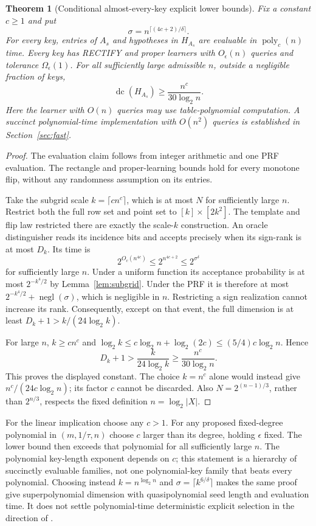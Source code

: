 \documentclass[11pt]{article}
\newtheorem{theorem}{Theorem}
\DeclareMathOperator{\dc}{dc}
\newcommand{\1}{\mathbf 1}
\begin{document}
\begin{samepage}
\begin{theorem}[Conditional almost-every-key explicit lower bounds]\label{thm:prf}
Fix a constant $c\ge1$ and put
\[
 \sigma=n^{\lceil(4c+2)/\delta\rceil}.
\]
For every key, entries of $A_s$ and hypotheses in $H_{A_s}$ are evaluable in $\operatorname{poly}_c(n)$ time. Every key has RECTIFY and proper learners with $O_\epsilon(n)$ queries and tolerance $\Omega_\epsilon(1)$. For all sufficiently large admissible $n$, outside a negligible fraction of keys,
\[
 \boxed{\dc(H_{A_s})\ge\frac{n^c}{30\log_2n}.}
\]
Here the learner with $O(n)$ queries may use table-polynomial computation. A succinct polynomial-time implementation with $O(n^2)$ queries is established in Section~\ref{sec:fast}.
\end{theorem}
\end{samepage}
\begin{proof}
The evaluation claim follows from integer arithmetic and one PRF evaluation. The rectangle and proper-learning bounds hold for every monotone flip, without any randomness assumption on its entries.

Take the subgrid scale $k=\lceil c n^c\rceil$, which is at most $N$ for sufficiently large $n$. Restrict both the full row set and point set to $[k]\times[2k^2]$. The template and flip law restricted there are exactly the scale-$k$ construction. An oracle distinguisher reads its incidence bits and accepts precisely when its sign-rank is at most $D_k$. Its time is
\[
 2^{O_c(n^{4c})}\le2^{n^{4c+2}}\le2^{\sigma^\delta}
\]
for sufficiently large $n$. Under a uniform function its acceptance probability is at most $2^{-k^4/2}$ by Lemma~\ref{lem:subgrid}. Under the PRF it is therefore at most $2^{-k^4/2}+\operatorname{negl}(\sigma)$, which is negligible in $n$. Restricting a sign realization cannot increase its rank. Consequently, except on that event, the full dimension is at least $D_k+1>k/(24\log_2k)$.

For large $n$, $k\ge c n^c$ and $\log_2k\le c\log_2n+\log_2(2c)\le(5/4)c\log_2n$. Hence
\[
 D_k+1>\frac{k}{24\log_2k}\ge\frac{n^c}{30\log_2n}.
\]
This proves the displayed constant. The choice $k=n^c$ alone would instead give $n^c/(24c\log_2n)$; its factor $c$ cannot be discarded. Also $N=2^{(n-1)/3}$, rather than $2^{n/3}$, respects the fixed definition $n=\log_2|X|$.
\end{proof}

For the linear implication choose any $c>1$. For any proposed fixed-degree polynomial in $(m,1/\tau,n)$ choose $c$ larger than its degree, holding $\epsilon$ fixed. The lower bound then exceeds that polynomial for all sufficiently large $n$. The polynomial key-length exponent depends on $c$; this statement is a hierarchy of succinctly evaluable families, not one polynomial-key family that beats every polynomial. Choosing instead $k=n^{\log_2n}$ and $\sigma=\lceil k^{6/\delta}\rceil$ makes the same proof give superpolynomial dimension with quasipolynomial seed length and evaluation time. It does not settle polynomial-time deterministic explicit selection in the direction of \citet[Problem~4.1]{HHPTZ22}.
\end{document}
